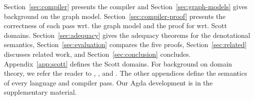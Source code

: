 Section~\ref{sec:compiler} presents the compiler and
Section~\ref{sec:graph-models} gives background on the graph model.
Section~\ref{sec:compiler-proof} presents the correctness of each pass
wrt. the graph model and the proof for  wrt. Scott
domains. Section~\ref{sec:adequacy} gives the adequacy theorems for
the denotational semantics, Section~\ref{sec:evaluation} compares the
five proofs, Section~\ref{sec:related} discusses related work, and
Section~\ref{sec:conclusion} concludes. Appendix~\ref{app:scott}
defines the Scott domains. For background on domain theory, we refer
the reader to \citet{Scott:1982aa}, \citet{Winskel:1993aa}, and
\citet{Abramsky:1994cr}. The other appendices define the semantics of
every language and compiler pass. Our Agda development is in the
supplementary material.
